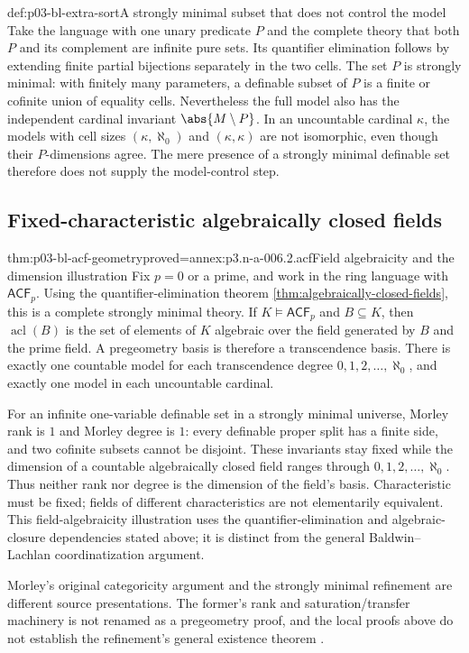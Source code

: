 \begin{hbexample}{def:p03-bl-extra-sort}{A strongly minimal subset that does not control the model}
Take the language with one unary predicate \(P\) and the complete theory
that both \(P\) and its complement are infinite pure sets. Its quantifier
elimination follows by extending finite partial bijections separately in
the two cells. The set \(P\) is strongly minimal: with finitely many
parameters, a definable subset of \(P\) is a finite or cofinite union of
equality cells. Nevertheless the full model also has the independent
cardinal invariant \(\abs{M\setminus P}\). In an uncountable cardinal
\(\kappa\), the models with cell sizes \((\kappa,\aleph_0)\) and
\((\kappa,\kappa)\) are not isomorphic, even though their \(P\)-dimensions
agree. The mere presence of a strongly minimal definable set therefore
does not supply the model-control step.
\end{hbexample}

\subsection{Fixed-characteristic algebraically closed fields}

\begin{hbtheorem}{thm:p03-bl-acf-geometry}{proved=annex:p3.n-a-006.2.acf}{Field algebraicity and the dimension illustration}
Fix \(p=0\) or a prime, and work in the ring language with
\(\mathsf{ACF}_p\). Using the quantifier-elimination theorem
\ref{thm:algebraically-closed-fields}, this is a complete strongly minimal theory.
If \(K\models\mathsf{ACF}_p\) and \(B\subseteq K\), then
\(\operatorname{acl}(B)\) is the set of elements of \(K\) algebraic over
the field generated by \(B\) and the prime field. A pregeometry basis is
therefore a transcendence basis. There is exactly one countable model for
each transcendence degree \(0,1,2,\ldots,\aleph_0\), and exactly one model
in each uncountable cardinal.
\end{hbtheorem}

For an infinite one-variable definable set in a strongly minimal universe,
Morley rank is \(1\) and Morley degree is \(1\): every definable proper
split has a finite side, and two cofinite subsets cannot be disjoint.
These invariants stay fixed while the dimension of a countable
algebraically closed field ranges through \(0,1,2,\ldots,\aleph_0\).
Thus neither rank nor degree is the dimension of the field's basis.
Characteristic must be fixed; fields of different characteristics are
not elementarily equivalent. This field-algebraicity illustration uses
the quantifier-elimination and algebraic-closure dependencies stated
above; it is distinct from the general Baldwin--Lachlan coordinatization
argument.

Morley's original categoricity argument and the strongly minimal
refinement are different source presentations. The former's rank and
saturation/transfer machinery is not renamed as a pregeometry proof, and
the local proofs above do not establish the refinement's general
existence theorem \cite{Morley1965,BaldwinLachlan1971}.
